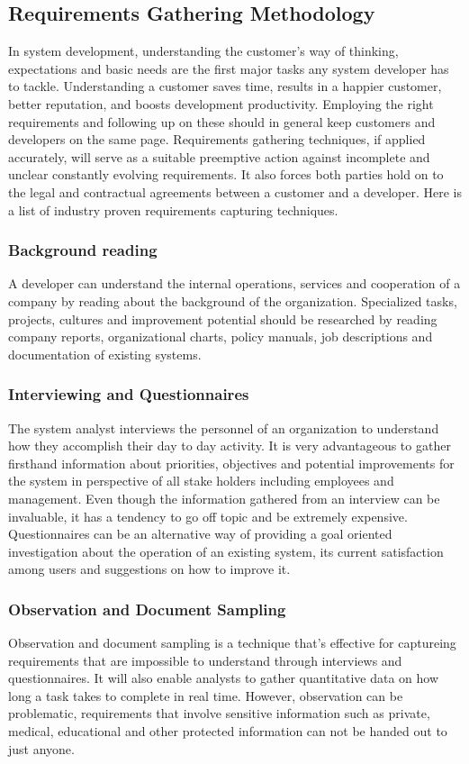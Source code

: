 \subsection{Requirements Gathering Methodology}

In system development, understanding the customer's way of thinking,
expectations and basic needs are the first major tasks any system developer has to
tackle. Understanding a customer saves time, results in a happier customer,
better reputation, and boosts development productivity. Employing the right
requirements and following up on these should in general keep customers and 
developers on the same page.
Requirements gathering techniques, if applied accurately, will serve as a
suitable preemptive action against incomplete and unclear constantly evolving
requirements. It also forces both parties hold on to the legal and
contractual agreements between a customer and a developer. Here is a list of
industry proven requirements capturing techniques.

\subsubsection{Background reading}

A developer can understand the internal operations, services and cooperation of
a company by reading about the background of the organization. Specialized
tasks, projects, cultures and improvement potential should be 
researched by reading company reports, organizational charts, policy manuals,
job descriptions and documentation of existing systems.

\subsubsection{Interviewing and Questionnaires}

The system analyst interviews the personnel of an organization to understand how
they accomplish their day to day activity. It is very advantageous to gather
firsthand information about priorities, objectives and potential improvements
for the system in perspective of all stake holders including employees and
management. Even though the information gathered from an
interview can be invaluable, it has a tendency to go off topic and be
extremely expensive. Questionnaires can be an alternative way of providing
a goal oriented investigation about the operation of an existing system, 
its current satisfaction among users and suggestions on how to improve it.

\subsubsection{Observation and Document Sampling}

Observation and document sampling is a technique that's effective for captureing
requirements that are impossible to understand through interviews and
questionnaires. It will also enable analysts to gather quantitative data on how
long a task takes to complete in real time. However, observation can be
problematic, requirements that involve sensitive information such as private, 
medical, educational and other protected information can not be handed out to just anyone.